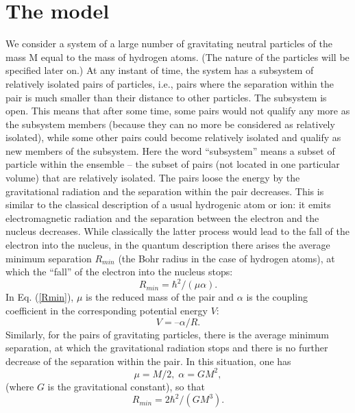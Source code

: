 \documentclass[referee]{raa}            %
\begin{document}
	
	\section{The model}
	\label{sect:Obs}
	
    We consider a system of a large number of gravitating neutral particles of the mass M equal to the mass of hydrogen atoms. (The nature of the particles will be specified later on.) At any instant of time, the system has a subsystem of relatively isolated pairs of particles, i.e., pairs where the separation within the pair is much smaller than their distance to other particles. The subsystem is open. This means that after some time, some pairs would not qualify any more as the subsystem members (because they can no more be considered as relatively isolated), while some other pairs could become relatively isolated and qualify as new members of the subsystem. Here the word “subsystem” means a subset of particle within the ensemble – the subset of pairs (not located in one particular volume) that are relatively isolated.
	The pairs loose the energy by the gravitational radiation and the separation within the pair decreases. This is similar to the classical description of a usual hydrogenic atom or ion: it emits electromagnetic radiation and the separation between the electron and the nucleus decreases. While classically the latter process would lead to the fall of the electron into the nucleus, in the quantum description there arises the average minimum separation $R_{min}$ (the Bohr radius in the case of hydrogen atoms), at which the “fall” of the electron into the nucleus stops:
	\begin{equation}	
		R_{min}= \hbar^2/(\mu\alpha).
		\label{Rmin}
	\end{equation}
     In Eq. (\ref{Rmin}), $\mu$ is the reduced mass of the pair and $\alpha$ is the coupling coefficient in the corresponding potential energy $V$:
     \begin{equation}
      V = –\alpha/R.
      \label{potV}
    \end{equation}
    Similarly, for the pairs of gravitating particles, there is the average minimum separation, at which the gravitational radiation stops and there is no further decrease of the separation within the pair. In this situation, one has 
    \begin{equation}
    	\mu=M/2,   \;  \alpha=GM^2, 
    	\label{MuAlpha}
    \end{equation}
	(where $G$ is the gravitational constant), so that 
	\begin{equation}
		R_{min}= 2\hbar^2/(GM^3).
		\label{Rmin=}
	\end{equation}
	
\end{document}
